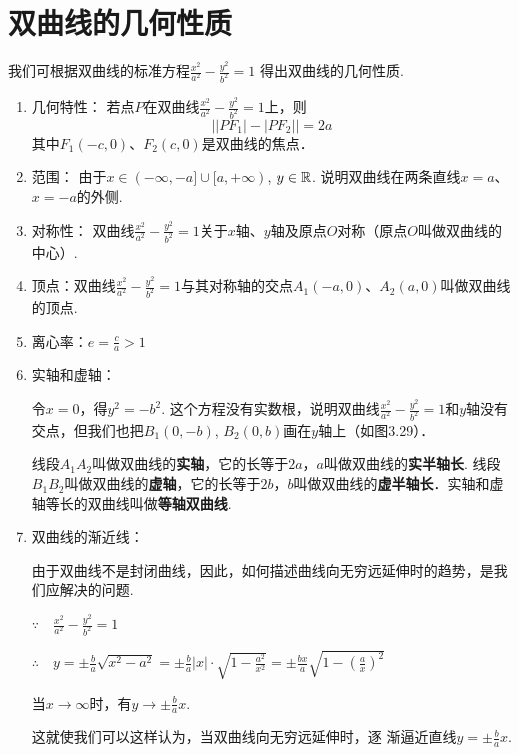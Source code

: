 \section{双曲线的几何性质}
我们可根据双曲线的标准方程$\frac{x^2}{a^2}-\frac{y^2}{b^2}=1$
得出双曲线的几何性质.
\begin{enumerate}
    \item 几何特性：
    若点$P$在双曲线$\frac{x^2}{a^2}-\frac{y^2}{b^2}=1$上，则
    \[\Big||PF_1|-|PF_2|\Big|=2a\]
    其中$F_1(-c,0)$、$F_2(c,0)$是双曲线的焦点．
    \item 范围：
    由于$x\in(-\infty,-a]\cup [a,+\infty)$, $y\in\mathbb{R}$. 说明双曲线在两条直线$x=a$、$x=-a$的外侧.
    \item 对称性：
    双曲线$\frac{x^2}{a^2}-\frac{y^2}{b^2}=1$关于$x$轴、$y$轴及原点$O$对称（原点$O$叫做双曲线的中心）.
    \item 顶点：双曲线$\frac{x^2}{a^2}-\frac{y^2}{b^2}=1$与其对称轴的交点$A_1(-a,0)$、$A_2(a,0)$叫做双曲线的顶点.
    \item 离心率：$e=\frac{c}{a}>1$
    \item 实轴和虚轴：

\noindent
\begin{minipage}{.5\textwidth}
    令$x=0$，得$y^2=-b^2$. 这个方程没有实数根，说明双曲线$\frac{x^2}{a^2}-\frac{y^2}{b^2}=1$和$y$轴没有交点，但我们也把$B_1(0,-b)$, $B_2(0,b)$画在$y$轴上（如图3.29）．

    线段$A_1A_2$叫做双曲线的\textbf{实轴}，它的长等于$2a$，$a$叫做双曲线的\textbf{实半轴长}. 线段$B_1B_2$叫做双曲线的\textbf{虚轴}，它的长等于$2b$，$b$叫做双曲线的\textbf{虚半轴长}．实轴和虚轴等长的双曲线叫做\textbf{等轴双曲线}.
\end{minipage}
\hfill
\begin{minipage}{.45\textwidth}
\centering
{}
\end{minipage}

\item 双曲线的渐近线：

    由于双曲线不是封闭曲线，因此，如何描述曲线向无穷远延伸时的趋势，是我们应解决的问题.

$\because\quad \frac{x^2}{a^2}-\frac{y^2}{b^2}=1$

$\therefore\quad y=\pm\frac{b}{a}\sqrt{x^2-a^2}=\pm\frac{b}{a}|x|\cdot \sqrt{1-\frac{a^2}{x^2}}=\pm\frac{bx}{a}\sqrt{1-\left(\frac{a}{x}\right)^2}$

当$x\to \infty$时，有$y\to \pm\frac{b}{a}x$.

这就使我们可以这样认为，当双曲线向无穷远延伸时，逐
渐逼近直线$y=\pm\frac{b}{a} x$.
\end{enumerate}

